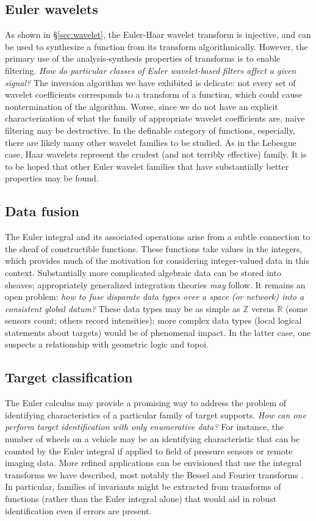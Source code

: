 \documentclass{psapm-l}
\theoremstyle{definition}
\theoremstyle{remark}
\numberwithin{equation}{section}
\begin{document}
\subsection{Euler wavelets}
As shown in \S\ref{sec:wavelet}, the Euler-Haar wavelet transform is injective, and can be used to synthesize a function from its transform algorithmically.  However, the primary use of the analysis-synthesis properties of transforms is to enable filtering.  {\em How do particular classes of Euler wavelet-based filters affect a given signal?} The inversion algorithm we have exhibited is delicate: not every set of wavelet coefficients corresponds to a transform of a function, which could cause nontermination of the algorithm.  Worse, since we do not have an explicit characterization of what the family of appropriate wavelet coefficients are, naive filtering may be destructive. In the definable category of functions, especially, there are likely many other wavelet families to be studied. As in the Lebesgue case, Haar wavelets represent the crudest (and not terribly effective) family. It is to be hoped that other Euler wavelet families that have substantially better properties may be found.

\subsection{Data fusion}
The Euler integral and its associated operations arise from a subtle connection to the sheaf of constructible functions. These functions take values in the integers, which provides much of the motivation for considering integer-valued data in this context.  Substantially more complicated algebraic data can be stored into sheaves; appropriately generalized integration theories {\em may} follow. It remains an open problem: {\em how to fuse disparate data types over a space (or network) into a consistent global datum?} These data types may be as simple as ${{\mathbb Z}}$ versus ${{\mathbb R}}$ (some sensors count; others record intensities); more complex data types (local logical statements about targets) would be of phenomenal impact. In the latter case, one suspects a relationship with geometric logic and topoi.

\subsection{Target classification}
The Euler calculus may provide a promising way to address the problem of identifying characteristics of a particular family of target supports. {\em How can one perform target identification with only enumerative data?} For instance, the number of wheels on a vehicle may be an identifying characteristic that can be counted by the Euler integral if applied to field of pressure sensors or remote imaging data.  More refined applications can be envisioned that use the integral transforms we have described, most notably the Bessel and Fourier transforms \cite{GR}.  In particular, families of invariants might be extracted from transforms of functions (rather than the Euler integral alone) that would aid in robust identification even if errors are present.
\end{document}
